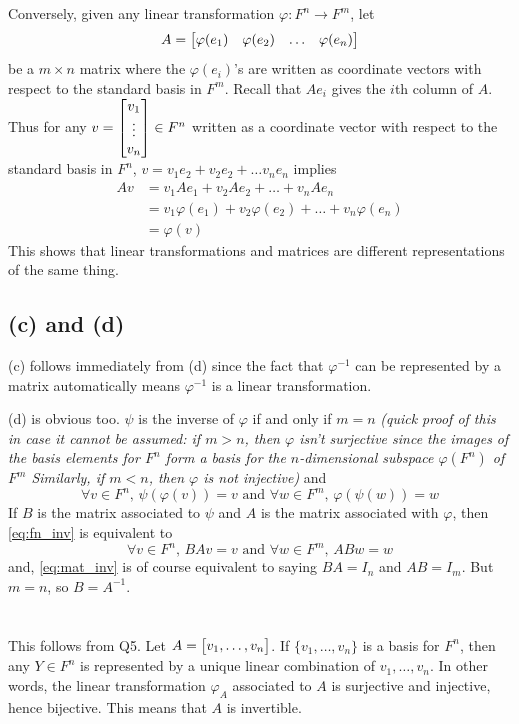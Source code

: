 \documentclass[12pt]{article}
\begin{document}
Conversely, given any linear transformation $\varphi: F^n \rightarrow F^m$, let 
$$A = \begin{bmatrix}\varphi(e_1) & \varphi(e_2) & \ldots & \varphi(e_n)\end{bmatrix}$$ 
be a $m \times n$ matrix where the $\varphi(e_i)$'s are written as coordinate vectors with respect to the standard basis in $F^m$. 
Recall that $Ae_i$ gives the $i$th column of $A$.
Thus for any $v = \begin{bmatrix}v_1 \\ \vdots \\ v_n\end{bmatrix} \in F^n$ written as a coordinate vector with respect to the standard basis in $F^n$, $v = v_1 e_2 + v_2 e_2 + \ldots v_n e_n$ implies  
\begin{align*}
  Av  & = v_1 Ae_1 + v_2 Ae_2 + \ldots + v_n Ae_n \\ 
      & = v_1 \varphi(e_1) + v_2 \varphi(e_2) + \ldots + v_n \varphi(e_n) \\ 
      & = \varphi(v)
\end{align*}
This shows that linear transformations and matrices are different representations of the same thing.  

\subsection*{(c) and (d)}
(c) follows immediately from (d) since the fact that $\varphi^{-1}$ can be represented by a matrix automatically means $\varphi^{-1}$ is a linear transformation. 

(d) is obvious too. 
$\psi$ is the inverse of $\varphi$ if and only if $m = n$ \textit{(quick proof of this in case it cannot be assumed: if $m > n$, then $\varphi$ isn't surjective since the images of the basis elements for $F^n$ form a basis for the $n$-dimensional subspace $\varphi(F^n)$ of $F^m$
Similarly, if $m < n$, then $\varphi$ is not injective)} and  
\begin{equation} \label{eq:fn_inv} 
  \forall v \in F^n, \, \psi(\varphi(v)) = v \text{ and } \forall w \in F^m, \, \varphi(\psi(w)) = w
\end{equation}
If $B$ is the matrix associated to $\psi$ and $A$ is the matrix associated with $\varphi$, then \eqref{eq:fn_inv} is equivalent to 
\begin{equation} \label{eq:mat_inv}
  \forall v \in F^n, \, BAv = v \text{ and } \forall w \in F^m, \, ABw = w
\end{equation}
and, \eqref{eq:mat_inv} is of course equivalent to saying $BA = I_n$ and $AB = I_m$. 
But $m = n$, so $B = A^{-1}$.  

\section{}
This follows from Q5. 
Let $A = \begin{bmatrix}v_1, \ldots, v_n\end{bmatrix}$. 
If $\{v_1, \ldots, v_n\}$ is a basis for $F^n$, then any $Y \in F^n$ is represented by a unique linear combination of $v_1, \ldots, v_n$.  
In other words, the linear transformation $\varphi_A$ associated to $A$ is surjective and injective, hence bijective. 
This means that $A$ is invertible. 
\end{document}
